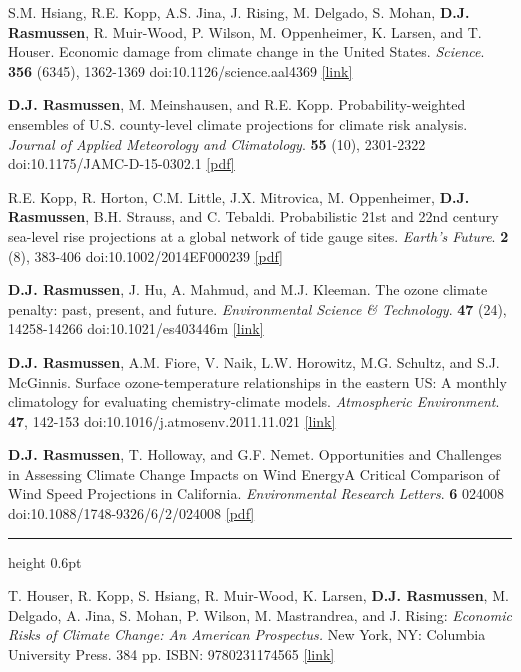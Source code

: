 \documentclass[10.5pt]{article}
\newcommand{\cvsection}[1]{%
  \par\addvspace{12pt}\pagebreak[3]%
  {\sffamily\bfseries\small\textls[80]{\MakeUppercase{#1}}}%
  \par\vspace{2pt}%
  {\color{rulegray}\hrule height 0.6pt}%
  \vspace{5pt}\nopagebreak}
\renewcommand{\section}[1]{\cvsection{#1}}
\newcommand{\yr}[1]{{\sffamily\bfseries #1}}
\begin{document}
\begin{entries}
\item[\yr{2017}] S.M. Hsiang, R.E. Kopp, A.S. Jina, J. Rising, M. Delgado, S. Mohan, \textbf{D.J. Rasmussen}, R. Muir-Wood, P. Wilson, M. Oppenheimer, K. Larsen, and T. Houser. Economic damage from climate change in the United States. \emph{Science}. \textbf{356} (6345), 1362-1369 doi:10.1126/science.aal4369 \href{https://doi.org/10.1126/science.aal4369}{[link]}
\item[\yr{2016}] \textbf{D.J. Rasmussen}, M. Meinshausen, and R.E. Kopp. Probability-weighted ensembles of U.S. county-level climate projections for climate risk analysis. \emph{Journal of Applied Meteorology and Climatology}. \textbf{55} (10), 2301-2322 doi:10.1175/JAMC-D-15-0302.1 \href{https://journals.ametsoc.org/doi/pdf/10.1175/JAMC-D-15-0302.1}{[pdf]}
\item[\yr{2014}] R.E. Kopp, R. Horton, C.M. Little, J.X. Mitrovica, M. Oppenheimer, \textbf{D.J. Rasmussen}, B.H. Strauss, and C. Tebaldi. Probabilistic 21st and 22nd century sea-level rise projections at a global network of tide gauge sites. \emph{Earth's Future}. \textbf{2} (8), 383-406 doi:10.1002/2014EF000239 \href{https://agupubs.onlinelibrary.wiley.com/doi/epdf/10.1002/2014EF000239}{[pdf]}
\item[\yr{2013}] \textbf{D.J. Rasmussen}, J. Hu, A. Mahmud, and M.J. Kleeman. The ozone climate penalty: past, present, and future. \emph{Environmental Science \& Technology}. \textbf{47} (24), 14258-14266 doi:10.1021/es403446m \href{https://doi.org/10.1021/es403446m}{[link]}
\item[\yr{2012}] \textbf{D.J. Rasmussen}, A.M. Fiore, V. Naik, L.W. Horowitz, M.G. Schultz, and S.J. McGinnis. Surface ozone-temperature relationships in the eastern US: A monthly climatology for evaluating chemistry-climate models. \emph{Atmospheric Environment}. \textbf{47}, 142-153 doi:10.1016/j.atmosenv.2011.11.021 \href{https://doi.org/10.1016/j.atmosenv.2011.11.021}{[link]}
\item[\yr{2011}] \textbf{D.J. Rasmussen}, T. Holloway, and G.F. Nemet. Opportunities and Challenges in Assessing Climate Change Impacts on Wind Energy\textemdash A Critical Comparison of Wind Speed Projections in California. \emph{Environmental Research Letters}. \textbf{6} 024008 doi:10.1088/1748-9326/6/2/024008 \href{https://iopscience.iop.org/article/10.1088/1748-9326/6/2/024008/pdf}{[pdf]}
\end{entries}

\section{Books}
\begin{entries}
\item[\yr{2015}] T. Houser, R. Kopp, S. Hsiang, R. Muir-Wood, K. Larsen, \textbf{D.J. Rasmussen}, M. Delgado, A. Jina, S. Mohan, P. Wilson, M. Mastrandrea, and J. Rising: \emph{Economic Risks of Climate Change: An American Prospectus.} New York, NY: Columbia University Press. 384 pp. ISBN: 9780231174565 \href{https://www.amazon.com/Economic-Risks-Climate-Change-Prospectus/dp/023117456X}{[link]}
\end{entries}
\end{document}
